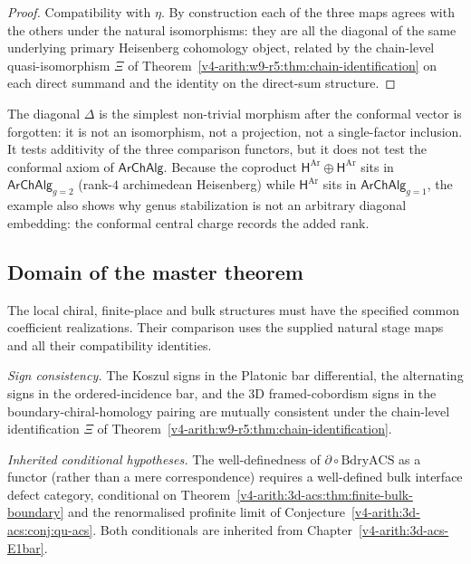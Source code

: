 \begin{proof}
Compatibility with \(\eta\). By construction each of the three maps
agrees with the others under the natural isomorphisms: they are all
the diagonal of the same underlying primary Heisenberg cohomology
object, related by the chain-level quasi-isomorphism \(\Xi\) of
Theorem~\ref{v4-arith:w9-r5:thm:chain-identification} on each direct
summand and the identity on the direct-sum structure.
\end{proof}

\begin{remark}
\label{v4-arith:w9-r5:rem:diagonal-witnesses}
The diagonal \(\Delta\) is the simplest non-trivial morphism after the
conformal vector is forgotten: it is not an isomorphism, not a
projection, not a single-factor inclusion. It tests additivity of the
three comparison functors, but it does not test the conformal axiom of
\(\mathsf{ArChAlg}\). Because the coproduct
\(\mathsf{H}^{\mathrm{Ar}}\oplus\mathsf{H}^{\mathrm{Ar}}\) sits in
\(\mathsf{ArChAlg}_{g=2}\) (rank-\(4\) archimedean Heisenberg) while
\(\mathsf{H}^{\mathrm{Ar}}\) sits in \(\mathsf{ArChAlg}_{g=1}\), the
example also shows why genus stabilization is not an arbitrary
diagonal embedding: the conformal central charge records the added
rank.
\end{remark}

\subsection*{Domain of the master theorem}
\label{v4-arith:w9-r5:ah:master}

The local chiral, finite-place and bulk structures must have the
specified common coefficient realizations. Their comparison uses the
supplied natural stage maps and all their compatibility identities.

\emph{Sign consistency.} The Koszul signs in the Platonic bar
differential, the alternating signs in the ordered-incidence bar,
and the 3D framed-cobordism signs in the boundary-chiral-homology
pairing are mutually consistent under the chain-level identification
\(\Xi\) of Theorem~\ref{v4-arith:w9-r5:thm:chain-identification}.

\emph{Inherited conditional hypotheses.} The well-definedness of
\(\partial\circ\mathrm{BdryACS}\) as a functor (rather than a mere
correspondence) requires a well-defined bulk interface defect
category, conditional on
Theorem~\ref{v4-arith:3d-acs:thm:finite-bulk-boundary} and the renormalised
profinite limit of Conjecture~\ref{v4-arith:3d-acs:conj:qu-acs}. Both
conditionals are inherited from Chapter~\ref{v4-arith:3d-acs-E1bar}.

